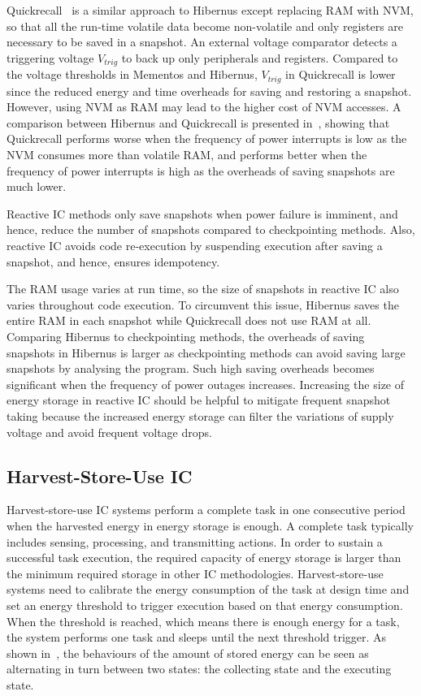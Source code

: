 Quickrecall~\cite{jayakumar2014quickrecall} is a similar approach to Hibernus except replacing RAM with NVM, so that all the run-time volatile data become non-volatile and only registers are necessary to be saved in a snapshot. An external voltage comparator detects a triggering voltage $V_{trig}$ to back up only peripherals and registers. Compared to the voltage thresholds in Mementos and Hibernus, $V_{trig}$ in Quickrecall is lower since the reduced energy and time overheads for saving and restoring a snapshot. However, using NVM as RAM may lead to the higher cost of NVM accesses. A comparison between Hibernus and Quickrecall is presented in~\cite{rodriguez2015approaches}, showing that Quickrecall performs worse when the frequency of power interrupts is low as the NVM consumes more than volatile RAM, and performs better when the frequency of power interrupts is high as the overheads of saving snapshots are much lower.

Reactive IC methods only save snapshots when power failure is imminent, and hence, reduce the number of snapshots compared to checkpointing methods. Also, reactive IC avoids code re-execution by suspending execution after saving a snapshot, and hence, ensures idempotency. 

The RAM usage varies at run time, so the size of snapshots in reactive IC also varies throughout code execution. To circumvent this issue, Hibernus saves the entire RAM in each snapshot while Quickrecall does not use RAM at all. Comparing Hibernus to checkpointing methods, the overheads of saving snapshots in Hibernus is larger as checkpointing methods can avoid saving large snapshots by analysing the program. Such high saving overheads becomes significant when the frequency of power outages increases. Increasing the size of energy storage in reactive IC should be helpful to mitigate frequent snapshot taking because the increased energy storage can filter the variations of supply voltage and avoid frequent voltage drops. 

\subsection{Harvest-Store-Use IC}

Harvest-store-use IC systems perform a complete task in one consecutive period when the harvested energy in energy storage is enough. A complete task typically includes sensing, processing, and transmitting actions. In order to sustain a successful task execution, the required capacity of energy storage is larger than the minimum required storage in other IC methodologies. Harvest-store-use systems need to calibrate the energy consumption of the task at design time and set an energy threshold to trigger execution based on that energy consumption. When the threshold is reached, which means there is enough energy for a task, the system performs one task and sleeps until the next threshold trigger. As shown in~, the behaviours of the amount of stored energy can be seen as alternating in turn between two states: the collecting state and the executing state.

